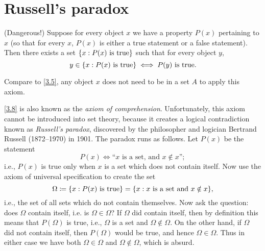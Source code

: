 \section{Russell's paradox}\label{sec:3.2}

\begin{ax}\label{3.8}
  (Dangerous!)
  Suppose for every object \(x\) we have a property \(P(x)\) pertaining to \(x\) (so that for every \(x\), \(P(x)\) is either a true statement or a false statement).
  Then there exists a set \(\left\lbrace x : P(x) \text{ is true}\right\rbrace\) such that for every object \(y\),
  \[
    y \in \left\lbrace x : P(x) \text{ is true}\right\rbrace \iff P(y) \text{ is true}.
  \]
\end{ax}

\begin{note}
  Compare to \cref{3.5}, any object \(x\) does not need to be in a set \(A\) to apply this axiom.
\end{note}

\begin{note}
  \cref{3.8} is also known as the \emph{axiom of comprehension}.
  Unfortunately, this axiom cannot be introduced into set theory, because it creates a logical contradiction known as \emph{Russell's paradox}, discovered by the philosopher and logician Bertrand Russell (1872--1970) in 1901.
  The paradox runs as follows.
  Let \(P(x)\) be the statement
  \[
    P(x) \iff \text{``\(x\) is a set, and \(x \notin x\)''};
  \]
  i.e., \(P(x)\) is true only when \(x\) is a set which does not contain itself.
  Now use the axiom of universal specification to create the set
  \[
    \Omega \coloneqq \set{x : P(x) \text{ is true}} = \set{x : x \text{ is a set and } x \notin x},
  \]
  i.e., the set of all sets which do not contain themselves.
  Now ask the question: does \(\Omega\) contain itself, i.e. is \(\Omega \in \Omega\)?
  If \(\Omega\) did contain itself, then by definition this means that \(P(\Omega)\) is true, i.e., \(\Omega\) is a set and \(\Omega \notin \Omega\).
  On the other hand, if \(\Omega\) did not contain itself, then \(P(\Omega)\) would be true, and hence \(\Omega \in \Omega\).
  Thus in either case we have both \(\Omega \in \Omega\) and \(\Omega \notin \Omega\), which is absurd.
\end{note}

